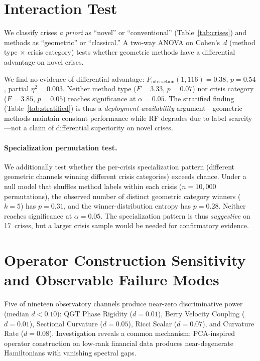\documentclass[3p]{elsarticle}
\begin{document}
\section{Interaction Test}\label{sec:interaction_test}

We classify crises \emph{a priori} as ``novel'' or ``conventional''
(Table~\ref{tab:crises}) and methods as ``geometric'' or
``classical.''  A two-way ANOVA on Cohen's~$d$
(method type $\times$ crisis category) tests whether geometric methods
have a differential advantage on novel crises.

We find no evidence of differential advantage:
$F_{\mathrm{interaction}}(1,116) = 0.38$, $p = 0.54$, partial
$\eta^2 = 0.003$.  Neither method type ($F = 3.33$, $p = 0.07$)
nor crisis category ($F = 3.85$, $p = 0.05$) reaches significance
at $\alpha = 0.05$.  The stratified finding
(Table~\ref{tab:stratified}) is thus a \emph{deployment-availability}
argument---geometric methods maintain constant performance while RF
degrades due to label scarcity---not a claim of differential superiority
on novel crises.

\paragraph{Specialization permutation test.}
We additionally test whether the per-crisis specialization pattern
(different geometric channels winning different crisis categories)
exceeds chance.  Under a null model that shuffles method labels within
each crisis ($n = 10{,}000$ permutations), the observed number of
distinct geometric category winners ($k = 5$) has $p = 0.31$, and
the winner-distribution entropy has $p = 0.28$.  Neither reaches
significance at $\alpha = 0.05$.  The specialization pattern is thus
\emph{suggestive} on 17~crises, but a larger crisis sample would be
needed for confirmatory evidence.


\section{Operator Construction Sensitivity and Observable Failure Modes}%
\label{sec:dead_signals}

Five of nineteen observatory channels produce near-zero discriminative
power (median $d < 0.10$): QGT Phase Rigidity ($d = 0.01$), Berry
Velocity Coupling ($d = 0.01$), Sectional Curvature ($d = 0.05$),
Ricci Scalar ($d = 0.07$), and Curvature Rate ($d = 0.08$).
Investigation reveals a common mechanism: PCA-inspired operator
construction on low-rank financial data produces near-degenerate
Hamiltonians with vanishing spectral gaps.
\end{document}
